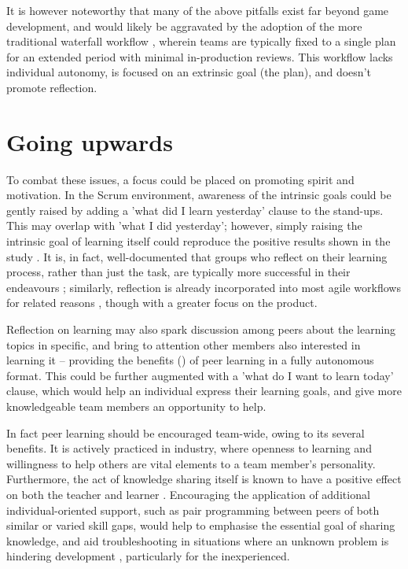 \documentclass{scrartcl}
\begin{document}
It is however noteworthy that many of the above pitfalls exist far beyond game development, and would likely be aggravated by the adoption of the more traditional waterfall workflow \cite{waterfall}, wherein teams are typically fixed to a single plan for an extended period with minimal in-production reviews. This workflow lacks individual autonomy, is focused on an extrinsic goal (the plan), and doesn't promote reflection.

\section{Going upwards}
To combat these issues, a focus could be placed on promoting spirit and motivation. In the Scrum environment, awareness of the intrinsic goals could be gently raised by adding a 'what did I learn yesterday' clause to the stand-ups. This may overlap with 'what I did yesterday'; however, simply raising the intrinsic goal of learning itself could reproduce the positive results shown in the study \cite{motivation}. It is, in fact, well-documented that groups who reflect on their learning process, rather than just the task, are typically more successful in their endeavours \cite{effectivegroups, learnreflection}; similarly, reflection is already incorporated into most agile workflows for related reasons \cite{agile, scrum}, though with a greater focus on the product.

Reflection on learning may also spark discussion among peers about the learning topics in specific, and bring to attention other members also interested in learning it -- providing the benefits (\cite{collaboration, motivation, group2005}) of peer learning in a fully autonomous format. This could be further augmented with a 'what do I want to learn today' clause, which would help an individual express their learning goals, and give more knowledgeable team members an opportunity to help.

In fact peer learning should be encouraged team-wide, owing to its several benefits. It is actively practiced in industry, where openness to learning \cite{devstudy} and willingness to help others \cite{collaboration} are vital elements to a team member's personality. Furthermore, the act of knowledge sharing itself is known to have a positive effect on both the teacher and learner \cite{activepassive, motivation}. Encouraging the application of additional individual-oriented support, such as pair programming between peers of both similar or varied skill gaps, would help to emphasise the essential goal of sharing knowledge, and aid troubleshooting in situations where an unknown problem is hindering development \cite{collaboration, motivation, devstudy}, particularly for the inexperienced.
\end{document}
